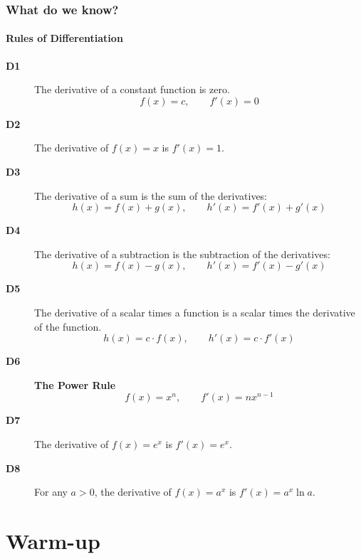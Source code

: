 \documentclass[9pt,xcolor=x11names,compress]{beamer}
\begin{document}
\begin{frame}\frametitle{What do we know?}
\framesubtitle{Rules of Differentiation}
\begin{description}
	\item[\textbf{D1}] The derivative of a constant function is zero.
	\begin{equation*}
		f(x)=c, \qquad f'(x)=0
	\end{equation*}
	\item[\textbf{D2}] The derivative of $f(x)=x$ is $f'(x)=1$.
	\item[\textbf{D3}] The derivative of a sum is the sum of the derivatives:
	\begin{equation*}
		h(x)=f(x)+g(x),\qquad h'(x)=f'(x)+g'(x)
	\end{equation*}
	\item[\textbf{D4}] The derivative of a subtraction is the subtraction of the derivatives:
	\begin{equation*}
		h(x)=f(x)-g(x),\qquad h'(x)=f'(x)-g'(x)
	\end{equation*}
	\item[\textbf{D5}] The derivative of a scalar times a function is a scalar times the derivative of the function.
	\begin{equation*}
		h(x)=c\cdot f(x),\qquad h'(x)=c\cdot f'(x)	
	\end{equation*}
	\item[\textbf{D6}] \textbf{The Power Rule}
	\begin{equation*}
		f(x)=x^n,\qquad f'(x)=nx^{n-1}
	\end{equation*}
	\item[\textbf{D7}] The derivative of $f(x)=e^x$ is $f'(x)=e^x$.
	\item[\textbf{D8}] For any $a>0$, the derivative of $f(x)=a^x$ is $f'(x)=a^x \ln a$.
\end{description}
\end{frame}

\section{Warm-up}
\subsection{}
\end{document}
